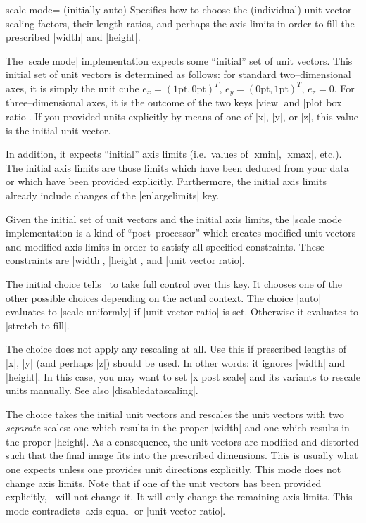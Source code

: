 \begin{pgfplotskey}{scale mode= (initially auto)}
	Specifies how to choose the (individual) unit vector scaling factors, their length ratios, and perhaps the axis limits in order to fill the prescribed |width| and |height|.
	
	The |scale mode| implementation expects some ``initial'' set of unit vectors. This initial set of unit vectors is determined as follows: for standard two--dimensional axes, it is simply the unit cube $e_x=(1\text{pt},0\text{pt})^T$, $e_y=(0\text{pt},1\text{pt})^T$, $e_z=0$. For three--dimensional axes, it is the outcome of the two keys |view| and |plot box ratio|. If you provided units explicitly by means of one of |x|, |y|, or |z|, this value is the initial unit vector.
	
	In addition, it expects ``initial'' axis limits (i.e.\ values of |xmin|, |xmax|, etc.). The initial axis limits are those limits which have been deduced from your data or which have been provided explicitly. Furthermore, the initial axis limits already include changes of the |enlargelimits| key.

	Given the initial set of unit vectors and the initial axis limits, the |scale mode| implementation is a kind of ``post--processor'' which creates modified unit vectors and modified axis limits in order to satisfy all specified constraints. These constraints are |width|, |height|, and |unit vector ratio|.

	The initial choice  tells \PGFPlots\ to take full control over this key. It chooses one of the other possible choices depending on the actual context. The choice |auto| evaluates to |scale uniformly| if |unit vector ratio| is set. Otherwise it evaluates to |stretch to fill|.

	The choice  does not apply any rescaling at all. Use this if prescribed lengths of |x|, |y| (and perhaps |z|) should be used. In other words: it ignores |width| and |height|. In this case, you may want to set |x post scale| and its variants to rescale units manually. See also |disabledatascaling|.

	The choice  takes the initial unit vectors and rescales the unit vectors with two \emph{separate} scales: one which results in the proper |width| and one which results in the proper |height|. As a consequence, the unit vectors are modified and distorted such that the final image fits into the prescribed dimensions. This is usually what one expects unless one provides unit directions explicitly. This mode does not change axis limits. Note that if one of the unit vectors has been provided explicitly, \PGFPlots\ will not change it. It will only change the remaining axis limits. This mode contradicts |axis equal| or |unit vector ratio|.
	

\end{pgfplotskey}
